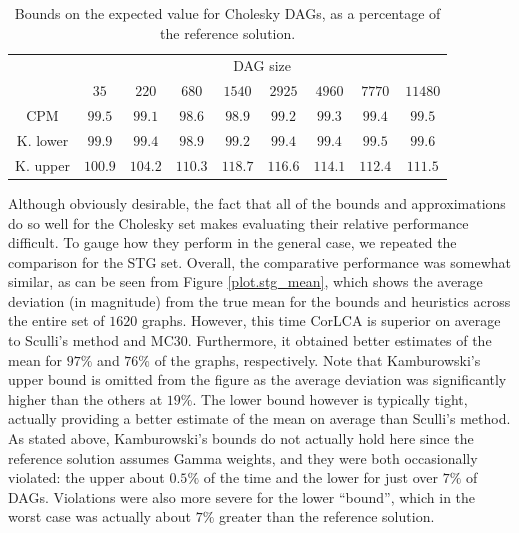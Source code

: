 \documentclass[12pt]{article}
\begin{document}
\begin{table}
	\caption{Bounds on the expected value for Cholesky DAGs, as a percentage of the reference solution.} 
	\begin{center}	
		\begin{tabular}{c c c c c c c c c}
                  \cmidrule{1-9}
                  & \multicolumn{8}{c}{DAG size} \\
                  \cmidrule{2-9}
			& $35$ & $220$ & $680$ & $1540$ & $2925$ & $4960$ & $7770$ & $11480$\\
			\cmidrule{1-9}
			CPM & $99.5$ & $99.1$ & $98.6$ & $98.9$ & $99.2$ & $99.3$ & $99.4$ & $99.5$\\
                  K. lower & $99.9$ & $99.4$ & $98.9$ & $99.2$ & $99.4$ & $99.4$ & $99.5$ & $99.6$\\
                  K. upper & $100.9$ & $104.2$ & $110.3$ & $118.7$ & $116.6$ & $114.1$ & $112.4$ & $111.5$\\
			\bottomrule
		\end{tabular}
		\label{tb.mean_existing}
	\end{center}	
      \end{table}

      Although obviously desirable, the fact that all of the bounds and approximations do so well for the Cholesky set makes evaluating their relative performance difficult. To gauge how they perform in the general case, we repeated the comparison for the STG set. Overall, the comparative performance was somewhat similar, as can be seen from Figure \ref{plot.stg_mean}, which shows the average deviation (in magnitude) from the true mean for the bounds and heuristics across the entire set of $1620$ graphs. However, this time CorLCA is superior on average to Sculli's method and MC30. Furthermore, it obtained better estimates of the mean for $97\%$ and $76\%$ of the graphs, respectively. Note that Kamburowski's upper bound is omitted from the figure as the average deviation was significantly higher than the others at $19\%$. The lower bound however is typically tight, actually providing a better estimate of the mean on average than Sculli's method. As stated above, Kamburowski's bounds do not actually hold here since the reference solution assumes Gamma weights, and they were both occasionally violated: the upper about $0.5\%$ of the time and the lower for just over $7\%$ of DAGs. Violations were also more severe for the lower ``bound'', which in the worst case was actually about $7\%$ greater than the reference solution.     
\end{document}
